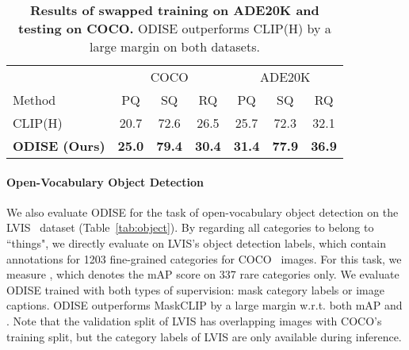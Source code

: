 \documentclass[10pt,twocolumn,letterpaper]{article}
\newcommand{\tablestyle}[2]{\setlength{\tabcolsep}{#1}\renewcommand{\arraystretch}{#2}\centering\small}
\newcommand{\ourmethod}{ODISE}
\begin{document}
\begin{table}[!h]
\tablestyle{6pt}{1.1}
\vspace{-1em}
\begin{tabular}{l|ccc|ccc}
                              & \multicolumn{3}{c|}{COCO}                & \multicolumn{3}{c}{ADE20K}          \\
   Method                    & PQ            & SQ            & RQ            & PQ            & SQ            & RQ            \\
   \shline
   CLIP(H)                   & 20.7          & 72.6          & 26.5          & 25.7          & 72.3          & 32.1          \\
   \textbf{\ourmethod{} (Ours)} & \textbf{25.0} & \textbf{79.4} & \textbf{30.4} & \textbf{31.4} & \textbf{77.9} & \textbf{36.9}
\end{tabular}
\caption{
    \label{tab:swap}
    \textbf{Results of swapped training on ADE20K and testing on COCO.} \ourmethod{} outperforms CLIP(H) by a large margin on both datasets.
}
\vspace{-1em}
\end{table}



\paragraph{Open-Vocabulary Object Detection}
We also evaluate \ourmethod{} for the task of open-vocabulary object detection on the LVIS~\cite{gupta2019lvis} dataset (Table~\ref{tab:object}). By regarding all categories to belong to ``things", we directly evaluate on LVIS's object detection labels, which contain annotations for 1203 fine-grained categories for COCO~\cite{lin2014coco} images. 
For this task, we measure
, which denotes the mAP score on 337 rare categories only. 
We evaluate \ourmethod{} trained with both types of supervision: mask category labels or image captions.
\ourmethod{} outperforms MaskCLIP\cite{ding2022open} by a large margin w.r.t. both mAP and .
Note that the validation split of LVIS\cite{gupta2019lvis} has overlapping images with COCO\cite{lin2014coco}'s training split, but the category labels of LVIS are only available during inference.
\end{document}
